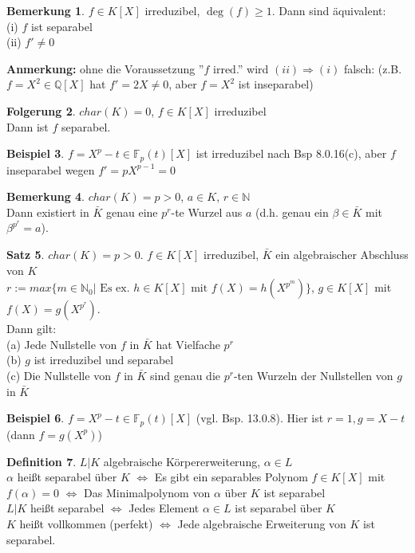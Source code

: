 \documentclass[10pt,a4paper,numbers=endperiod]{scrreprt}
\theoremstyle{definition}
\newtheorem{satz}{Satz}[section]
\newtheorem{defi}[satz]{Definition}
\newtheorem{bem}[satz]{Bemerkung}
\newtheorem{bsp}[satz]{Beispiel}
\newtheorem{folg}[satz]{Folgerung}
\def\QQ{{\mathbb Q}}
\def\NN{{\mathbb N}}
\def\FF{{\mathbb F}}
\begin{document}
\begin{bem}
	$f \in K[X]$ irreduzibel, $\deg (f) \geq 1$. Dann sind äquivalent:\\
	(i) $f$ ist separabel\\
	(ii) $f' \neq 0$
\end{bem}

\textbf{Anmerkung:} ohne die Voraussetzung ''$f$ irred.'' wird $(ii) \Rightarrow (i)$ falsch: (z.B. $f = X^2 \in \QQ[X]$ hat $f' = 2X \neq 0$, aber $f = X^2$ ist inseparabel)

\begin{folg}
	$char(K) = 0$, $f \in K[X]$ irreduzibel\\
	Dann ist $f$ separabel.
\end{folg}

\begin{bsp}
	$f = X^p - t \in \FF_p(t)[X]$ ist irreduzibel nach Bsp 8.0.16(c), aber $f$ inseparabel wegen $f' = pX^{p-1} = 0$
\end{bsp}

\begin{bem}
	$char(K) = p > 0$, $a \in K$, $r \in \NN$\\
	Dann existiert in $\bar{K}$ genau eine $p^r$-te Wurzel aus $a$ (d.h. genau ein $\beta \in \bar{K}$ mit $\beta^{p^r} = a$).
\end{bem}

\begin{satz}
	$char(K) = p > 0$. $f \in K[X]$ irreduzibel, $\bar{K}$ ein algebraischer Abschluss von $K$\\
	$r := max\{m \in \NN_0| \text{ Es ex. } h \in K[X] \text{ mit } f(X) = h(X^{p^m})\}$, $g \in K[X]$ mit $f(X) = g(X^{p^r})$.\\
	Dann gilt:\\
	(a) Jede Nullstelle von $f$ in $\bar{K}$ hat Vielfache $p^r$\\
	(b) $g$ ist irreduzibel und separabel\\
	(c) Die Nullstelle von $f$ in $\bar{K}$ sind genau die $p^r$-ten Wurzeln der Nullstellen von $g$ in $\bar{K}$
\end{satz}

\begin{bsp}
	$f = X^p - t \in \FF_p(t)[X]$ (vgl. Bsp. 13.0.8). Hier ist $r = 1, g = X-t$ (dann $f = g(X^p)$)
\end{bsp}

\begin{defi}
	$L|K$ algebraische Körpererweiterung, $\alpha \in L$\\
	$\alpha$ heißt separabel über $K$ $\Leftrightarrow$ Es gibt ein separables Polynom $f \in K[X]$ mit $f(\alpha) = 0$ $\Leftrightarrow$ Das Minimalpolynom von $\alpha$ über $K$ ist separabel\\
	$L|K$ heißt separabel $\Leftrightarrow$ Jedes Element $\alpha \in L$ ist separabel über $K$\\
	$K$ heißt vollkommen (perfekt) $\Leftrightarrow$ Jede algebraische Erweiterung von $K$ ist separabel.
\end{defi}
\end{document}

